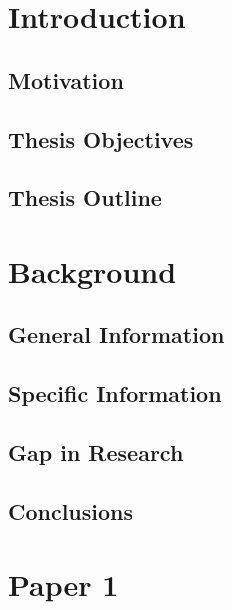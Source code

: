  \truedoublespacing

\chapter{Introduction}\label{ch:Introduction}
  \lipsum[6-8]
  \section{Motivation}\label{sec:Motivation}
    \lipsum[1-3]
  \section{Thesis Objectives}\label{sec:thesisObjective}
    \lipsum[14-16]
  \section{Thesis Outline}\label{sec:thesisOutline}
    \lipsum[17]
                
\chapter{Background}\label{ch:Background}
  \section{General Information}\label{sec:}
    \lipsum[23-25]
  \section{Specific Information}\label{sec:}
    \lipsum[35-37]
  \section{Gap in Research}\label{sec:}
    \lipsum[42-43]
  \section{Conclusions}\label{sec:}
    \lipsum[12-13]

\chapter{Paper 1}\label{ch:Paper1}
